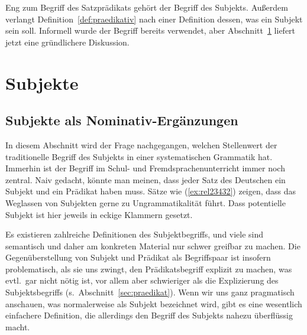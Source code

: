 
Eng zum Begriff des Satzprädikats gehört der Begriff des Subjekts.
Außerdem verlangt Definition~\ref{def:praedikativ} nach einer Definition dessen, was ein Subjekt sein soll.
Informell wurde der Begriff bereits verwendet, aber Abschnitt~\ref{sec:subjekt} liefert jetzt eine gründlichere Diskussion.

\section{Subjekte}

\label{sec:subjekt}

\subsection{Subjekte als Nominativ-Ergänzungen}


In diesem Abschnitt wird der Frage nachgegangen, welchen Stellenwert der traditionelle Begriff des Subjekts in einer systematischen Grammatik hat.
Immerhin ist der Begriff im Schul- und Fremdsprachenunterricht immer noch zentral.
Naiv gedacht, könnte man meinen, dass jeder Satz des Deutschen ein Subjekt und ein Prädikat haben muss.
Sätze wie (\ref{ex:rel23432}) zeigen, dass das Weglassen von Subjekten gerne zu Ungrammatikalität führt.
Dass potentielle Subjekt ist hier jeweils in eckige Klammern gesetzt.

\begin{exe}
  \ex\label{ex:rel23432}
  \begin{xlist}
  \end{xlist}
\end{exe}

Es existieren zahlreiche Definitionen des Subjektbegriffs, und viele sind semantisch und daher am konkreten Material nur schwer greifbar zu machen.
Die Gegenüberstellung von Subjekt und Prädikat als Begriffspaar ist insofern problematisch, als sie uns zwingt, den Prädikatsbegriff explizit zu machen, was evtl.\ gar nicht nötig ist, vor allem aber schwieriger als die Explizierung des Subjektsbegriffs (s.\ Abschnitt~\ref{sec:praedikat}).
Wenn wir uns ganz pragmatisch anschauen, was normalerweise als Subjekt bezeichnet wird, gibt es eine wesentlich einfachere Definition, die allerdings den Begriff des Subjekts nahezu überflüssig macht.

